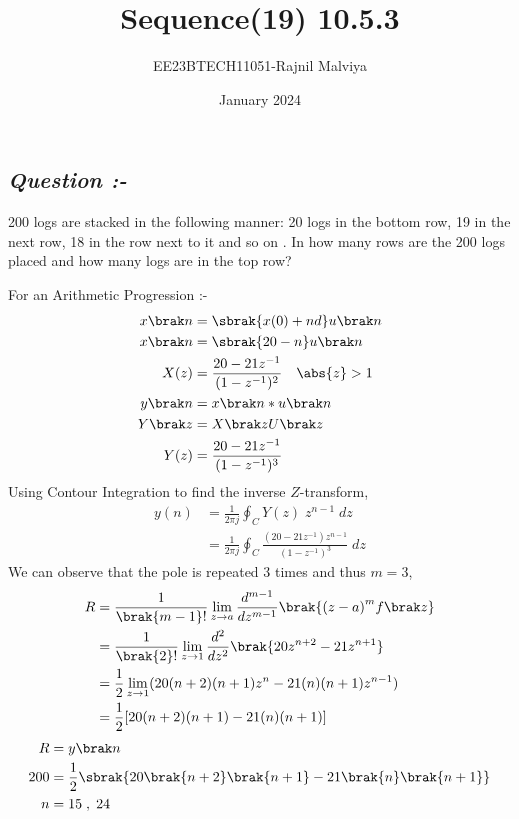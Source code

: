 \documentclass[journal,12pt,twocolumn]{IEEEtran}
\theoremstyle{remark}
\begin{document}
\title{Sequence(19) 10.5.3}
\author{EE23BTECH11051-Rajnil Malviya}
\date{January 2024}
\maketitle
\subsection*{\textit{Question :-}}
200 logs are stacked in the following manner: 20 logs in the bottom row, 19 in the next row,
18 in the row next to it and so on . In how many rows are the 200 logs placed
and how many logs are in the top row?

\begin{table}[h!]
   
        
       
    \end{table}
For an Arithmetic Progression :-
\begin{align}x\brak n&=\sbrak {x(0)+n d} u \brak n\\
x\brak n&=\sbrak{20-n} u \brak n\\
 X(z)&=\frac{20-21z^{-1}}{(1 - z^{-1})^2}  \quad \abs{ z} > 1\\
y \brak n &= x\brak n*u\brak n\\
Y \brak z &= X\brak zU\brak z\\\
Y(z) &= \frac{20-21z^{-1}}{(1 - z^{-1})^3}\end{align}
 Using Contour Integration to find the inverse $Z$-transform,
\begin{align}
    y(n)&=\frac{1}{2\pi j}\oint_{C}Y(z) \;z^{n-1} \;dz  \\
    &=\frac{1}{2\pi j}\oint_{C} \frac{(20-21z^{-1}) z^{n-1}}{(1 - z^{-1})^3} \;dz 
\end{align}
We can observe that the pole is repeated $3$ times and thus $m=3$,
\begin{align}
    R&=\frac{1}{\brak {m-1}!}\lim\limits_{z\to a}\frac{d^{m-1}}{dz^{m-1}}\brak {{(z-a)}^{m}f\brak z}  \\
    &=\frac{1}{\brak {2}!}\lim\limits_{z\to 1}\frac{d^{2}}{dz^{2}}\brak {20 z^{n+2}-21 z^{n+1}}   \\
    &=\frac{1}{2}\lim\limits_{z\to 1}(20(n+2)(n+1)z^{n}-21(n)(n+1)z^{n-1})   \\
    &=\frac{1}{2}[20(n+2)(n+1)-21(n)(n+1)]\end{align}
      \begin{align}
       R &= y\brak n \\
  200 &=\frac{1}{2}\sbrak{20\brak{n+2}\brak{n+1}-21\brak{n}\brak{n+1}}\\
   n &=15\; ,\;24\end{align}
\end{document}

